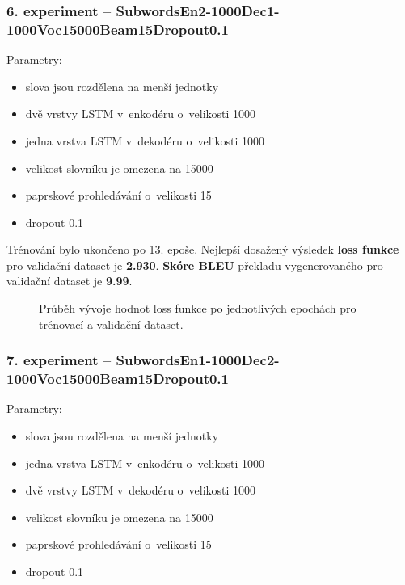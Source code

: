 \subsubsection{6. experiment -- SubwordsEn2-1000Dec1-1000Voc15000Beam15Dropout0.1}\label{experiment6}
Parametry:
\begin{itemize}
  \item slova jsou rozdělena na menší jednotky
  \item dvě vrstvy LSTM v~enkodéru o~velikosti 1000
  \item jedna vrstva LSTM v~dekodéru o~velikosti 1000
  \item velikost slovníku je omezena na 15000
  \item paprskové prohledávání o~velikosti 15
  \item dropout 0.1
\end{itemize}

Trénování bylo ukončeno po 13. epoše. Nejlepší dosažený výsledek \textbf{loss funkce} pro validační dataset je \textbf{2.930}. \textbf{Skóre BLEU} překladu vygenerovaného pro validační dataset je \textbf{9.99}.

\begin{figure}[H]
    \begin{center}
    \end{center}
	\caption{Průběh vývoje hodnot loss funkce po jednotlivých epochách pro trénovací a validační dataset.}
\end{figure}

\subsubsection{7. experiment -- SubwordsEn1-1000Dec2-1000Voc15000Beam15Dropout0.1}\label{experiment7}
Parametry:
\begin{itemize}
  \item slova jsou rozdělena na menší jednotky
  \item jedna vrstva LSTM v~enkodéru o~velikosti 1000
  \item dvě vrstvy LSTM v~dekodéru o~velikosti 1000
  \item velikost slovníku je omezena na 15000
  \item paprskové prohledávání o~velikosti 15
  \item dropout 0.1
\end{itemize}

